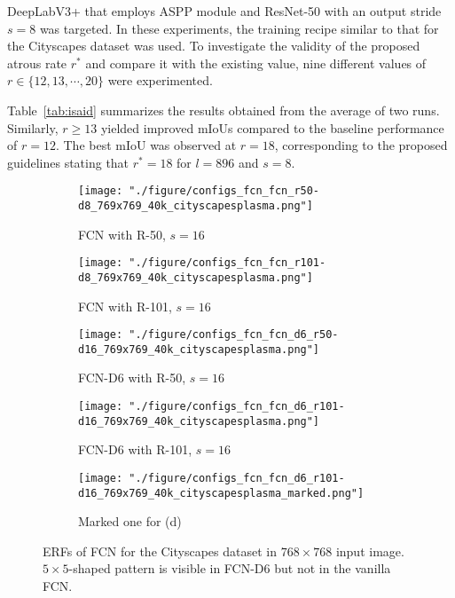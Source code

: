\documentclass{article}
\def\tabref#1{Table~\ref{#1}}
\begin{document}
DeepLabV3+ that employs ASPP module and ResNet-50 with an output stride $s=8$ was targeted. In these experiments, the training recipe similar to that for the Cityscapes dataset was used. To investigate the validity of the proposed atrous rate $r^*$ and compare it with the existing value, nine different values of $r \in \{12, 13, \cdots, 20\}$ were experimented.

\tabref{tab:isaid} summarizes the results obtained from the average of two runs. Similarly, $r \geq 13$ yielded improved mIoUs compared to the baseline performance of $r=12$. The best mIoU was observed at $r=18$, corresponding to the proposed guidelines stating that $r^*=18$ for $l=896$ and $s=8$.

\begin{figure}[t!]
	\centering
	\begin{subfigure}[b]{0.191\linewidth}
		\centering
		\texttt{[image: "./figure/configs\_fcn\_fcn\_r50-d8\_769x769\_40k\_cityscapesplasma.png"]}
		\caption{FCN with R-50, $s=16$}
	\end{subfigure}
	\hfill
	\begin{subfigure}[b]{0.191\linewidth}
		\centering
		\texttt{[image: "./figure/configs\_fcn\_fcn\_r101-d8\_769x769\_40k\_cityscapesplasma.png"]}
		\caption{FCN with R-101, $s=16$}
	\end{subfigure}
	\hfill
	\begin{subfigure}[b]{0.191\linewidth}
		\centering
		\texttt{[image: "./figure/configs\_fcn\_fcn\_d6\_r50-d16\_769x769\_40k\_cityscapesplasma.png"]}
		\caption{FCN-D6 with R-50, $s=16$}
	\end{subfigure}
	\hfill
	\begin{subfigure}[b]{0.191\linewidth}
		\centering
		\texttt{[image: "./figure/configs\_fcn\_fcn\_d6\_r101-d16\_769x769\_40k\_cityscapesplasma.png"]}
		\caption{FCN-D6 with R-101, $s=16$}
	\end{subfigure}
	\hfill
	\begin{subfigure}[b]{0.191\linewidth}
		\centering
		\texttt{[image: "./figure/configs\_fcn\_fcn\_d6\_r101-d16\_769x769\_40k\_cityscapesplasma\_marked.png"]}
		\caption{Marked one for (d)}
	\end{subfigure}
	\caption{ERFs of FCN for the Cityscapes dataset in $768 \times 768$ input image. $5 \times 5$-shaped pattern is visible in FCN-D6 but not in the vanilla FCN.}
	\label{fig:fcn}
\end{figure}
\end{document}
